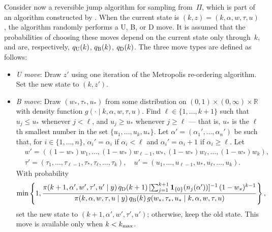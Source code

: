\documentclass[12pt]{article}
\newcommand{\ind}{\mathbf{1}}
\begin{document}
Consider now a reversible jump algorithm for sampling from~$\Pi$, which is part of an algorithm constructed by \cite{richardson1997bayesian}.
When the current state is $(k,z) = (k,\alpha,w,\tau,u)$, the algorithm randomly performs a U, B, or D move.
It is assumed that the probabilities of choosing these moves depend on the current state only through~$k$, and are, respectively, $q_{\scriptsize\mbox{U}}(k)$, $q_{\scriptsize\mbox{B}}(k)$, $q_{\scriptsize\mbox{D}}(k)$.
The three move types are defined as follows:

\begin{itemize}
	\item {\it U move}:
	Draw $z'$ using one iteration of the Metropolis re-ordering algorithm.
	Set the new state to $(k,z')$.
	
	\item {\it B move}:
	Draw $(w_*, \tau_*, u_*)$ from some distribution on $(0,1) \times (0,\infty) \times \mathbb{R}$ with density function $g(\cdot \mid k, \alpha, w, \tau, u)$.
	Find $\ell \in \{1,\dots,k+1\}$ such that $u_j \leq u_*$ whenever $j < \ell$, and $u_j \geq u_*$ whenever $j \geq \ell$ --- that is, $u_*$ is the $\ell$th smallest number in the set $\{u_1, \dots, u_k, u_*\}$.
	Let $\alpha' = (\alpha_1', \dots, \alpha_n')$ be such that, for $i \in \{1,\dots,n\}$, $\alpha_i' = \alpha_i$ if $\alpha_i < \ell$ and $\alpha_i' = \alpha_i + 1$ if $\alpha_i \geq \ell$.
	Let
	\[
	\begin{aligned}
		&w' = ((1-w_*)w_1, \dots, (1-w_*) w_{\ell-1}, w_*, (1-w_*) w_{\ell}, \dots, (1-w_*) w_k ), \\
		&\tau' = (\tau_1, \dots, \tau_{\ell-1}, \tau_*, \tau_{\ell}, \dots, \tau_k), \quad u' = (u_1, \dots, u_{\ell-1}, u_*, u_{\ell}, \dots, u_k).
	\end{aligned}
	\]
	With probability
	\[
	\min\left\{ 1, \frac{\pi(k+1, \alpha', w', \tau', u' \mid y) \, q_{\scriptsize\mbox{D}}(k+1) \, [\sum_{j=1}^{k+1} \ind_{\{0\}}(n_j(\alpha')) ]^{-1} \, (1-w_*)^{k-1} }{ \pi(k, \alpha, w, \tau, u \mid y) \, q_{\scriptsize\mbox{B}}(k) \, g(w_*, \tau_*, u_* \mid k, \alpha, w, \tau, u) }  \right\},
	\]
	set the new state to $(k+1, \alpha', w', \tau', u')$;
	otherwise, keep the old state.
	This move is available only when $k < k_{\scriptsize\mbox{max}}$.
	

\end{itemize}
\end{document}
